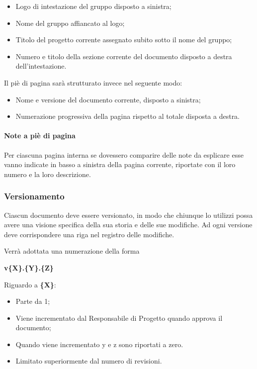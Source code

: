	\begin{itemize}
	
		\item Logo di intestazione del gruppo disposto a sinistra;
		\item Nome del gruppo affiancato al logo;
		\item Titolo del progetto corrente assegnato subito sotto il nome del gruppo;
		\item Numero e titolo della sezione corrente del documento disposto a destra dell'intestazione.
	
	\end{itemize}
	
	Il piè di pagina sarà strutturato invece nel seguente modo:
	
	\begin{itemize}
	
		\item Nome e versione del documento corrente, disposto a sinistra;
		\item Numerazione progressiva della pagina rispetto al totale disposta a destra.
	
	\end{itemize}
	
	\paragraph{Note a piè di pagina}
	
	Per ciascuna pagina interna se dovessero comparire delle note da esplicare esse vanno indicate in basso a sinistra della pagina corrente, riportate con il loro numero e la loro descrizione.

\subsubsection{Versionamento}

Ciascun documento deve essere versionato, in modo che chiunque lo utilizzi possa avere una visione specifica della sua storia e delle sue modifiche. Ad ogni versione deve corrispondere una riga nel registro delle modifiche.

Verrà adottata una numerazione della forma
\begin{center}
 \textbf{v\{X\}.\{Y\}.\{Z\}}
\end{center}

Riguardo a \textbf{\{X\}}:
\begin{itemize}
 \item Parte da 1;
 \item Viene incrementato dal Responsabile di Progetto quando approva il documento;
 \item Quando viene incrementato y e z sono riportati a zero.
 \item Limitato superiormente dal numero di revisioni.
\end{itemize}

